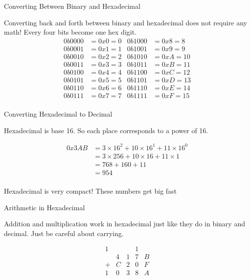 \begin{frame}{Converting Between Binary and Hexadecimal}

	Converting back and forth between binary and hexadecimal does not require any
	math! Every four bits become one hex digit.
	\begin{align*}
		0b0000 & = 0x0 = 0 & 0b1000 & = 0x8 = 8  \\
		0b0001 & = 0x1 = 1 & 0b1001 & = 0x9 = 9  \\
		0b0010 & = 0x2 = 2 & 0b1010 & = 0xA = 10 \\
		0b0011 & = 0x3 = 3 & 0b1011 & = 0xB = 11 \\
		0b0100 & = 0x4 = 4 & 0b1100 & = 0xC = 12 \\
		0b0101 & = 0x5 = 5 & 0b1101 & = 0xD = 13 \\
		0b0110 & = 0x6 = 6 & 0b1110 & = 0xE = 14 \\
		0b0111 & = 0x7 = 7 & 0b1111 & = 0xF = 15 \\
	\end{align*}
\end{frame}

\begin{frame}{Converting Hexadecimal to Decimal}

	Hexadecimal is base 16. So each place corresponds to a power of 16.

	\begin{align*}
		0x3AB & = 3 \times 16^2 + 10 \times 16^1 + 11 \times 16^0 \\
		      & = 3 \times 256 + 10 \times 16 + 11 \times 1       \\
		      & = 768 + 160 + 11                                  \\
		      & = 954                                             \\
	\end{align*}

	Hexadecimal is very compact! These numbers get big fast

\end{frame}

\begin{frame}{Arithmetic in Hexadecimal}

	Addition and multiplication work in hexadecimal just like they do in binary and
	decimal. Just be careful about carrying.

	\[
		\begin{array}{ccccc}
			1 &   &   & 1 &   \\
			  & 4 & 1 & 7 & B \\
			+ & C & 2 & 0 & F \\
			\hline
			1 & 0 & 3 & 8 & A \\
		\end{array}
	\]

\end{frame}

